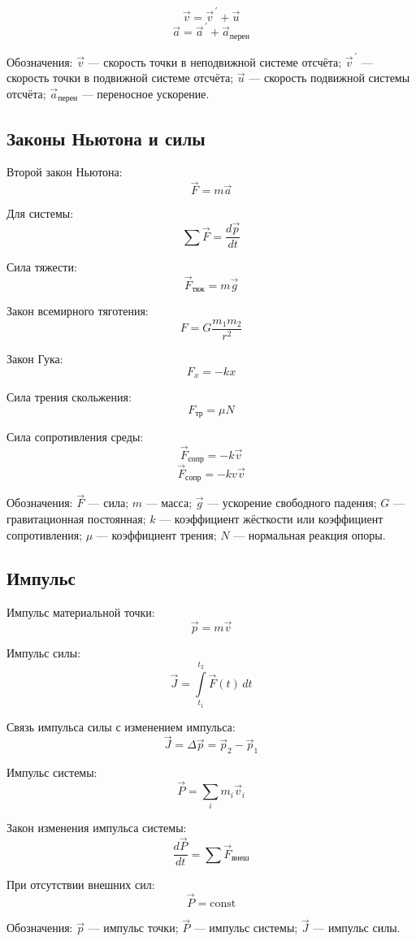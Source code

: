 \documentclass[a4paper,12pt]{article}
\begin{document}
\[
\vec v = \vec v^{\, \prime} + \vec u
\]
\[
\vec a = \vec a^{\, \prime} + \vec a_{\text{перен}}
\]

Обозначения:  
\(\vec v\) — скорость точки в неподвижной системе отсчёта;  
\(\vec v^{\, \prime}\) — скорость точки в подвижной системе отсчёта;  
\(\vec u\) — скорость подвижной системы отсчёта;  
\(\vec a_{\text{перен}}\) — переносное ускорение.

\subsection{Законы Ньютона и силы}

Второй закон Ньютона:
\[
\vec F = m \vec a
\]

Для системы:
\[
\sum \vec F = \frac{d\vec p}{dt}
\]

Сила тяжести:
\[
\vec F_{\text{тяж}} = m \vec g
\]

Закон всемирного тяготения:
\[
F = G \frac{m_1 m_2}{r^2}
\]

Закон Гука:
\[
F_x = -k x
\]

Сила трения скольжения:
\[
F_{\text{тр}} = \mu N
\]

Сила сопротивления среды:
\[
\vec F_{\text{сопр}} = -k \vec v
\] 
\[
\vec F_{\text{сопр}} = -k v \vec v
\]

Обозначения:  
\(\vec F\) — сила;  
\(m\) — масса;  
\(\vec g\) — ускорение свободного падения;  
\(G\) — гравитационная постоянная;  
\(k\) — коэффициент жёсткости или коэффициент сопротивления;  
\(\mu\) — коэффициент трения;  
\(N\) — нормальная реакция опоры.

\subsection{Импульс}

Импульс материальной точки:
\[
\vec p = m \vec v
\]

Импульс силы:
\[
\vec J = \int\limits_{t_1}^{t_2} \vec F\left(t\right)\, dt
\]

Связь импульса силы с изменением импульса:
\[
\vec J = \Delta \vec p = \vec p_2 - \vec p_1
\]

Импульс системы:
\[
\vec P = \sum\limits_i m_i \vec v_i
\]

Закон изменения импульса системы:
\[
\frac{d\vec P}{dt} = \sum \vec F_{\text{внеш}}
\]

При отсутствии внешних сил:
\[
\vec P = \text{const}
\]

Обозначения:  
\(\vec p\) — импульс точки;  
\(\vec P\) — импульс системы;  
\(\vec J\) — импульс силы.
\end{document}
